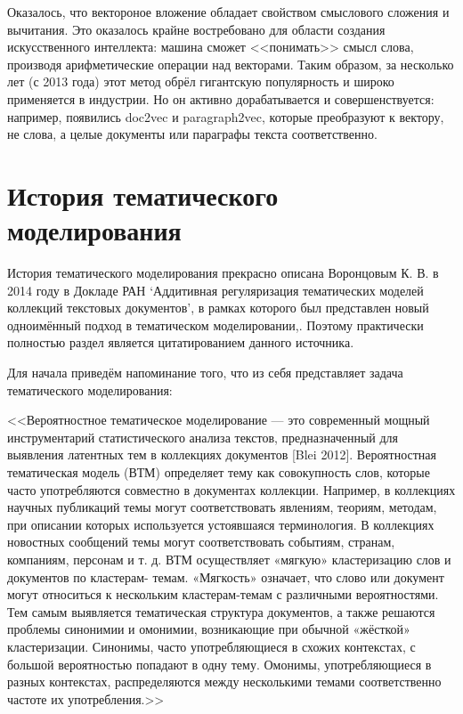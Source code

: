 \documentclass[a4paper,14pt]{extarticle}
\begin{document}
Оказалось, что вектороное вложение обладает свойством смыслового сложения и вычитания. Это оказалось крайне востребовано для области создания искусственного интеллекта: машина сможет <<понимать>> смысл слова, производя арифметические операции над векторами. Таким образом, за несколько лет (с 2013 года) этот метод обрёл гигантскую популярность и широко применяется в индустрии. Но он активно дорабатывается и совершенствуется: например, появились doc2vec  и paragraph2vec, которые преобразуют к вектору, не слова, а целые документы или параграфы текста соответственно.
\section{История тематического моделирования}
История тематического моделирования прекрасно описана  Воронцовым К. В.  в 2014 году в Докладе РАН `Аддитивная регуляризация тематических моделей коллекций текстовых документов', в рамках которого был представлен новый одноимённый подход в тематическом моделировании,. Поэтому практически полностью раздел является цитатированием данного источника.

Для начала приведём  напоминание того, что из себя представляет задача тематического  моделирования:

<<Вероятностное тематическое моделирование ---
это современный мощный инструментарий статистического анализа текстов,
предназначенный для выявления латентных тем в коллекциях документов [Blei
2012]. Вероятностная тематическая модель (ВТМ) определяет тему как
совокупность слов, которые часто употребляются совместно в документах
коллекции. Например, в коллекциях научных публикаций темы могут
соответствовать явлениям, теориям, методам, при описании которых используется
устоявшаяся терминология. В коллекциях новостных сообщений темы могут
соответствовать событиям, странам, компаниям, персонам и т. д.
ВТМ осуществляет «мягкую» кластеризацию слов и документов по кластерам-
темам. «Мягкость» означает, что слово или документ могут относиться к
нескольким кластерам-темам с различными вероятностями. Тем самым выявляется
тематическая структура документов, а также решаются проблемы синонимии и
омонимии, возникающие при обычной «жёсткой» кластеризации. Синонимы, часто
употребляющиеся в схожих контекстах, с большой вероятностью попадают в одну
тему. Омонимы, употребляющиеся в разных контекстах, распределяются между
несколькими темами соответственно частоте их употребления.>>
\end{document}
